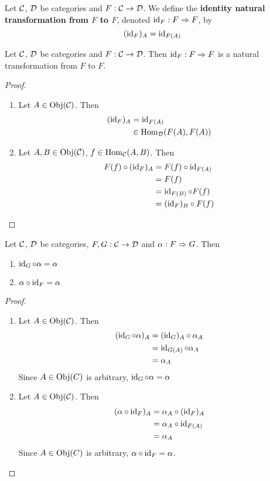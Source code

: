 \documentclass{book}
\begin{document}
	\begin{defn} 
		Let $\mathcal{C}$, $\mathcal{D}$ be categories and $F: \mathcal{C} \rightarrow \mathcal{D}$. We define the \textbf{identity natural transformation from $F$ to $F$}, denoted $\operatorname{id}_{F}: F \Rightarrow F$, by 
		$$(\operatorname{id}_F)_A = \operatorname{id}_{F(A)}$$
	\end{defn}
	
	\begin{ex}  
		Let $\mathcal{C}$, $\mathcal{D}$ be categories and $F: \mathcal{C} \rightarrow \mathcal{D}$. Then $\operatorname{id}_F: F \Rightarrow F$ is a natural transformation from $F$ to $F$.
	\end{ex}
	
	\begin{proof}\
		\begin{enumerate}
			\item Let $A \in \operatorname{Obj}(\mathcal{C})$. Then 
			\begin{align*}
				(\operatorname{id}_F)_A 
				& = \operatorname{id}_{F(A)} \\
				& \in \operatorname{Hom}_{\mathcal{D}}(F(A), F(A))
			\end{align*}
			\item Let $A,B \in \operatorname{Obj}(\mathcal{C})$, $f \in \operatorname{Hom}_{\mathcal{C}}(A,B)$. Then 
			\begin{align*}
				F(f) \circ (\operatorname{id}_{F})_{A} 
				& = F(f) \circ \operatorname{id}_{F(A)} \\
				& = F(f) \\
				& = \operatorname{id}_{F(B)} \circ F(f) \\
				& = (\operatorname{id}_{F})_{B} \circ F(f)
			\end{align*}
		\end{enumerate}
	\end{proof}

	\begin{ex} 
		Let $\mathcal{C}$, $\mathcal{D}$ be categories, $F,G: \mathcal{C} \rightarrow \mathcal{D}$ and $\alpha : F \Rightarrow G$. Then 
		\begin{enumerate}
			\item $\operatorname{id}_{G} \circ \alpha = \alpha$
			\item $\alpha \circ \operatorname{id}_F = \alpha$
		\end{enumerate} 
	\end{ex}

	\begin{proof}\
		\begin{enumerate}
			\item Let $A \in \operatorname{Obj}(\mathcal{C})$. Then 
			\begin{align*}
				(\operatorname{id}_{G} \circ \alpha)_{A}
				& = (\operatorname{id}_G)_A \circ \alpha_A \\
				& = \operatorname{id}_{G(A)} \circ \alpha_A \\
				& = \alpha_A 
			\end{align*}
			Since $A \in \operatorname{Obj}(C)$ is arbitrary, $\operatorname{id}_{G} \circ \alpha = \alpha$
			\item Let $A \in \operatorname{Obj}(\mathcal{C})$. Then
			\begin{align*}
				(\alpha \circ \operatorname{id}_F)_{A}
				& = \alpha_A \circ (\operatorname{id}_F)_A \\
				& = \alpha_A \circ \operatorname{id}_{F(A)} \\
				& = \alpha_A 
			\end{align*}
			Since $A \in \operatorname{Obj}(C)$ is arbitrary, $\alpha \circ \operatorname{id}_F = \alpha$.
		\end{enumerate}
	\end{proof}
\end{document}
